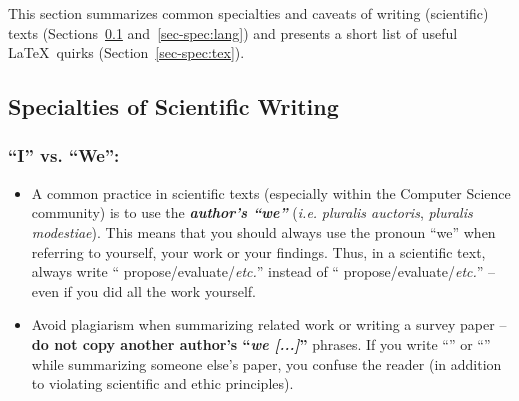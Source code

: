 \documentclass[11pt,a4paper]{article}
\begin{document}
This section summarizes common specialties and caveats of writing (scientific) texts (Sections~\ref{sec-spec:sci} and~\ref{sec-spec:lang}) and presents a short list of useful \LaTeX~quirks (Section~\ref{sec-spec:tex}).


\subsection{Specialties of Scientific Writing}
\label{sec-spec:sci}

\subsubsection*{``I'' vs. ``We'':}
\begin{itemize}
\item A common practice in scientific texts (especially within the Computer 
Science community) is to use the \emph{\textbf{author's ``we''}} (\emph{i.e.} 
\emph{pluralis auctoris}, \emph{pluralis modestiae}).
  This means that you should always use the pronoun ``we'' when referring to yourself, your work or your findings.
  Thus, in a scientific text, always write `` propose/evaluate/\emph{etc.}'' instead of `` propose/evaluate/\emph{etc.}'' -- even if you did all the work yourself.

  
\item Avoid plagiarism when summarizing related work or writing a survey paper 
-- \textbf{do not copy another author's ``\emph{we [...]}''} phrases.
  If you write ``'' or ``'' while summarizing someone else's paper, you confuse the reader (in addition to violating scientific and ethic principles).
\end{itemize}
\end{document}
